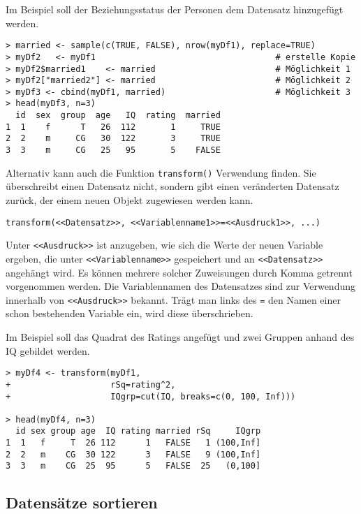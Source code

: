 Im Beispiel soll der Beziehungsstatus der Personen dem Datensatz hinzugefügt werden.
\begin{lstlisting}
> married <- sample(c(TRUE, FALSE), nrow(myDf1), replace=TRUE)
> myDf2   <- myDf1                                    # erstelle Kopie
> myDf2$married1    <- married                        # Möglichkeit 1
> myDf2["married2"] <- married                        # Möglichkeit 2
> myDf3 <- cbind(myDf1, married)                      # Möglichkeit 3
> head(myDf3, n=3)
  id  sex  group  age   IQ  rating  married
1  1    f      T   26  112       1     TRUE
2  2    m     CG   30  122       3     TRUE
3  3    m     CG   25   95       5    FALSE
\end{lstlisting}

Alternativ kann auch die Funktion \lstinline!transform()! Verwendung finden. Sie überschreibt einen Datensatz nicht, sondern gibt einen veränderten Datensatz zurück, der einem neuen Objekt zugewiesen werden kann.
\begin{lstlisting}
transform(<<Datensatz>>, <<Variablenname1>>=<<Ausdruck1>>, ...)
\end{lstlisting}

Unter \lstinline!<<Ausdruck>>! ist anzugeben, wie sich die Werte der neuen Variable ergeben, die unter \lstinline!<<Variablenname>>! gespeichert und an \lstinline!<<Datensatz>>! angehängt wird. Es können mehrere solcher Zuweisungen durch Komma getrennt vorgenommen werden. Die Variablennamen des Datensatzes sind zur Verwendung innerhalb von \lstinline!<<Ausdruck>>! bekannt. Trägt man links des \lstinline!=! den Namen einer schon bestehenden Variable ein, wird diese überschrieben.

Im Beispiel soll das Quadrat des Ratings angefügt und zwei Gruppen anhand des IQ gebildet werden.
\begin{lstlisting}
> myDf4 <- transform(myDf1,
+                    rSq=rating^2,
+                    IQgrp=cut(IQ, breaks=c(0, 100, Inf)))

> head(myDf4, n=3)
  id sex group age  IQ rating married rSq     IQgrp
1  1   f     T  26 112      1   FALSE   1 (100,Inf]
2  2   m    CG  30 122      3   FALSE   9 (100,Inf]
3  3   m    CG  25  95      5   FALSE  25   (0,100]
\end{lstlisting}

\subsection{Datensätze sortieren}
\label{sec:sortDf}

